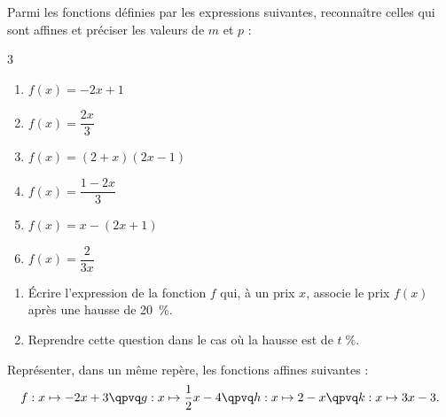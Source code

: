 
\exo

Parmi les fonctions définies par les expressions suivantes, reconnaître celles qui sont affines et préciser les valeurs de $m$ et $p$ :

\vspace{-8pt}
\setlength{\columnsep}{1cm}
\setlength{\columnseprule}{0pt}
\begin{multicols}{3}
\begin{enumerate}
\item $f(x)=-2x+1$
\smallskip
\item $f(x)=\dfrac{2x}{3}$
\item $f(x)=(2+x)(2x-1)$
\smallskip
\item $f(x)=\dfrac{1-2x}{3}$
\item $f(x)=x-(2x+1)$
\smallskip
\item $f(x)=\dfrac{2}{3x}$
\end{enumerate}
\end{multicols}

\exo

\begin{enumerate}
\item Écrire l'expression de la fonction $f$ qui, à un prix $x$, associe le prix $f(x)$ après une hausse de \SI[retain-explicit-plus]{20}{\percent}.
\item Reprendre cette question dans le cas où la hausse est de $t\;\%$.
\end{enumerate}

\exo

Représenter, dans un même repère, les fonctions affines suivantes :
\[
f:x\mapsto -2x+3
\qpvq
g:x\mapsto \frac{1}{2}x-4
\qpvq
h:x\mapsto 2-x
\qpvq
k:x\mapsto 3x-3.\]

\exo

